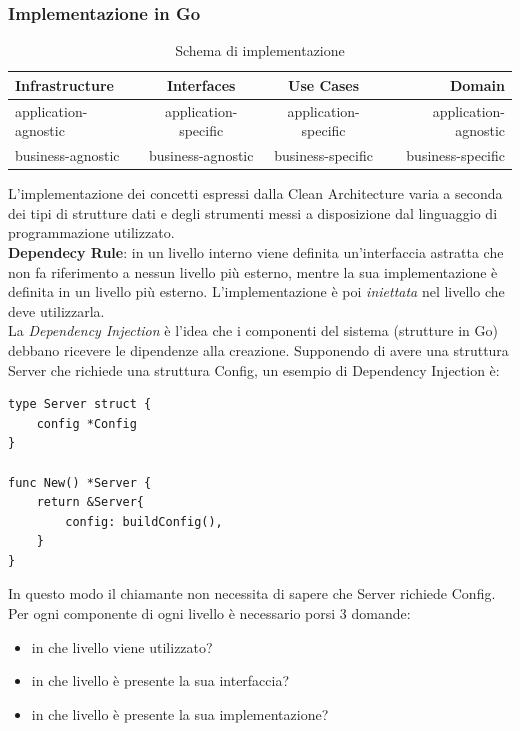 \documentclass[a4paper]{article}
\begin{document}
\subsubsection{Implementazione in Go}
\begin{table}[ht]
\small
\begin{tabular}{lccr} %
    \toprule
    Infrastructure & Interfaces & Use Cases & Domain \\
    \midrule
    application-agnostic & application-specific & application-specific & application-agnostic\\
    business-agnostic & business-agnostic & business-specific & business-specific\\
    \bottomrule
\end{tabular}
\vskip 0.2cm
\caption{Schema di implementazione}
\end{table}

L'implementazione dei concetti espressi dalla Clean Architecture varia a seconda dei tipi di strutture dati e degli strumenti messi a disposizione dal linguaggio di programmazione utilizzato.\\

\textbf{Dependecy Rule}: in un livello interno viene definita un'interfaccia astratta che non fa riferimento a nessun livello più esterno, mentre la sua implementazione è definita in un livello più esterno. L'implementazione è poi \textit{iniettata} nel livello che deve utilizzarla.\\
La \textit{Dependency Injection} è l'idea che i componenti del sistema (strutture in Go) debbano ricevere le dipendenze alla creazione. Supponendo di avere una struttura Server che richiede una struttura Config, un esempio di Dependency Injection è:
\begin{lstlisting}[style=customgo, caption=esempio di Dependency Injection, captionpos=b]
type Server struct {
    config *Config
}

func New() *Server {
    return &Server{
        config: buildConfig(),
    }
}
\end{lstlisting}
In questo modo il chiamante non necessita di sapere che Server richiede Config.\cite{dep_inj}\cite{clean_implementation}\\
Per ogni componente di ogni livello è necessario porsi 3 domande:
\begin{itemize}
    \item in che livello viene utilizzato?
        
    \item in che livello è presente la sua interfaccia?
        
    \item in che livello è presente la sua implementazione?
\end{itemize}
\end{document}
